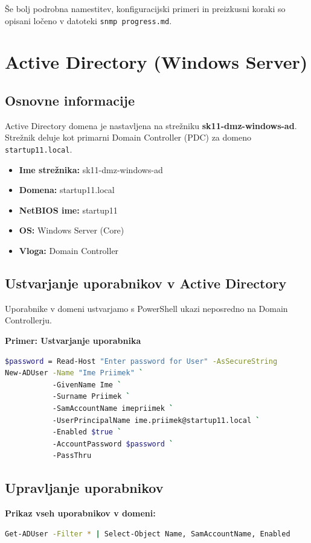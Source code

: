 \documentclass[a4paper,11pt]{article}
\begin{document}
Še bolj podrobna namestitev, konfiguracijski primeri in preizkusni koraki so opisani ločeno v datoteki \texttt{snmp progress.md}.


\section{Active Directory (Windows Server)}
\subsection{Osnovne informacije}
Active Directory domena je nastavljena na strežniku \textbf{sk11-dmz-windows-ad}. Strežnik deluje kot primarni Domain Controller (PDC) za domeno \texttt{startup11.local}.

\begin{itemize}
    \item \textbf{Ime strežnika:} sk11-dmz-windows-ad
    \item \textbf{Domena:} startup11.local
    \item \textbf{NetBIOS ime:} startup11
    \item \textbf{OS:} Windows Server (Core)
    \item \textbf{Vloga:} Domain Controller
\end{itemize}

\subsection{Ustvarjanje uporabnikov v Active Directory}
Uporabnike v domeni ustvarjamo s PowerShell ukazi neposredno na Domain Controllerju.

\textbf{Primer: Ustvarjanje uporabnika}
\begin{lstlisting}[language=bash, breaklines=true]
$password = Read-Host "Enter password for User" -AsSecureString
New-ADUser -Name "Ime Priimek" `
           -GivenName Ime `
           -Surname Priimek `
           -SamAccountName imepriimek `
           -UserPrincipalName ime.priimek@startup11.local `
           -Enabled $true `
           -AccountPassword $password `
           -PassThru
\end{lstlisting}

\subsection{Upravljanje uporabnikov}
\textbf{Prikaz vseh uporabnikov v domeni:}
\begin{lstlisting}[language=bash, breaklines=true]
Get-ADUser -Filter * | Select-Object Name, SamAccountName, Enabled
\end{lstlisting}
\end{document}
